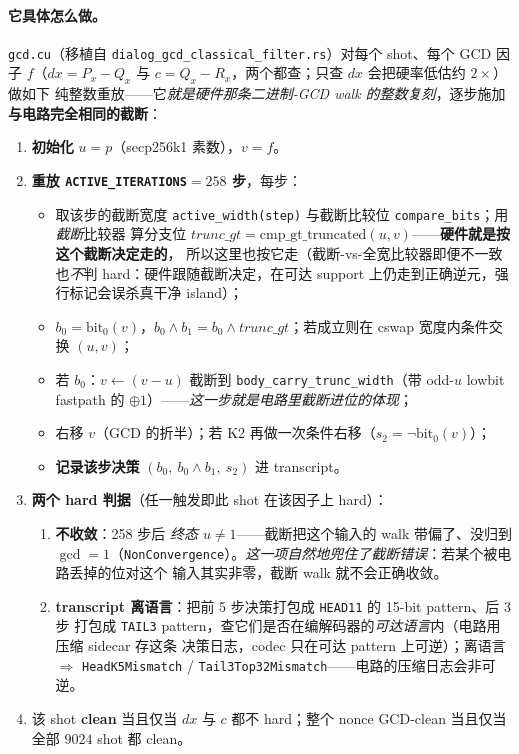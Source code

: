 \documentclass[11pt]{ctexart}
\let\c\lstinline
\begin{document}
\paragraph{它具体怎么做。}\c{gcd.cu}（移植自 \c{dialog_gcd_classical_filter.rs}）对每个 shot、每个
GCD 因子 $f$（$dx=P_x{-}Q_x$ 与 $c=Q_x{-}R_x$，两个都查；只查 $dx$ 会把硬率低估约 $2\times$）做如下
纯整数重放——它\emph{就是硬件那条二进制-GCD walk 的整数复刻}，逐步施加\textbf{与电路完全相同的截断}：
\begin{enumerate}[nosep]
  \item \textbf{初始化} $u=p$（secp256k1 素数），$v=f$。
  \item \textbf{重放 \c{ACTIVE_ITERATIONS}$=258$ 步}，每步：
  \begin{itemize}[nosep]
    \item 取该步的截断宽度 \c{active_width(step)} 与截断比较位 \c{compare_bits}；用\emph{截断}比较器
    算分支位 $\textit{trunc\_gt}=\text{cmp\_gt\_truncated}(u,v)$——\textbf{硬件就是按这个截断决定走的}，
    所以这里也按它走（截断-vs-全宽比较器即便不一致也\emph{不}判 hard：硬件跟随截断决定，在可达
    support 上仍走到正确逆元，强行标记会误杀真干净 island）；
    \item $b_0=\text{bit}_0(v)$，$b_0{\wedge}b_1 = b_0 \wedge \textit{trunc\_gt}$；若成立则在 cswap
    宽度内条件交换 $(u,v)$；
    \item 若 $b_0$：$v \leftarrow (v-u)$ 截断到 \c{body_carry_trunc_width}（带 odd-$u$ lowbit
    fastpath 的 $\oplus 1$）——\emph{这一步就是电路里截断进位的体现}；
    \item 右移 $v$（GCD 的折半）；若 K2 再做一次条件右移（$s_2=\lnot\text{bit}_0(v)$）；
    \item \textbf{记录该步决策} $(b_0,\ b_0{\wedge}b_1,\ s_2)$ 进 transcript。
  \end{itemize}
  \item \textbf{两个 hard 判据}（任一触发即此 shot 在该因子上 hard）：
  \begin{enumerate}[label=(\alph*),nosep]
    \item \textbf{不收敛}：258 步后 \emph{终态 $u\neq 1$}——截断把这个输入的 walk 带偏了、没归到
    $\gcd{=}1$（\c{NonConvergence}）。\emph{这一项自然地兜住了截断错误}：若某个被电路丢掉的位对这个
    输入其实非零，截断 walk 就不会正确收敛。
    \item \textbf{transcript 离语言}：把前 5 步决策打包成 \texttt{HEAD11} 的 15-bit pattern、后 3 步
    打包成 \texttt{TAIL3} pattern，查它们是否在编解码器的\emph{可达语言}内（电路用压缩 sidecar 存这条
    决策日志，codec 只在可达 pattern 上可逆）；离语言 $\Rightarrow$ \c{HeadK5Mismatch} /
    \c{Tail3Top32Mismatch}——电路的压缩日志会非可逆。
  \end{enumerate}
  \item 该 shot \textbf{clean} 当且仅当 $dx$ 与 $c$ 都不 hard；整个 nonce GCD-clean 当且仅当全部
  $9024$ shot 都 clean。
\end{enumerate}
\end{document}
